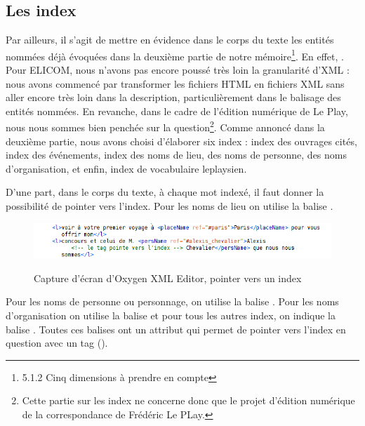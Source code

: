 \subsection{Les index}

Par ailleurs, il s'agit de mettre en évidence dans le corps du texte les entités nommées déjà évoquées dans la deuxième partie de notre mémoire\footnote{5.1.2 Cinq dimensions à prendre en compte}. En effet, . Pour ELICOM, nous n'avons pas encore poussé très loin la granularité d'XML : nous avons commencé par transformer les fichiers HTML en fichiers XML sans aller encore très loin dans la description, particulièrement dans le balisage des entités nommées.
En revanche, dans le cadre de l'édition numérique de Le Play, nous nous sommes bien penchée sur la question\footnote{Cette partie sur les index ne concerne donc que le projet d'édition numérique de la correspondance de Frédéric Le PLay.}. Comme annoncé dans la deuxième partie, nous avons choisi d'élaborer six index : index des ouvrages cités, index des événements, index des noms de lieu, des noms de personne, des noms d'organisation, et enfin, index de vocabulaire leplaysien. 


D'une part, dans le corps du texte, à chaque mot indexé, il faut donner la possibilité de pointer vers l'index. Pour les noms de lieu on utilise la balise .
\begin{figure}[ht]
    \centering
    \caption{Capture d'écran d'Oxygen XML Editor, pointer vers un index}
    \includegraphics[width=16cm]{images/index.png}
    \label{index}
\end{figure}
Pour les noms de personne ou personnage, on utilise la balise . Pour les noms d'organisation on utilise la balise  et pour tous les autres index, on indique la balise . Toutes ces balises ont un attribut  qui permet de pointer vers l'index en question avec un tag (\citecode{\#}).



